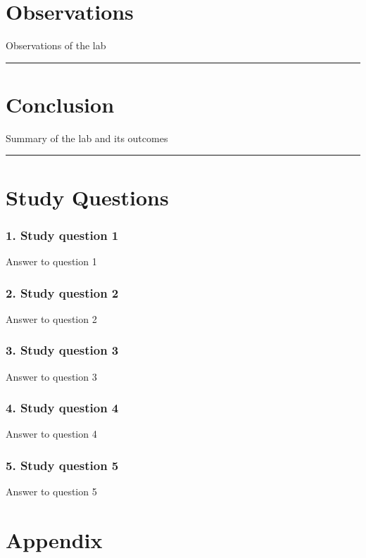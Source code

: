\documentclass{article}
\begin{document}
\section*{\textcolor{mycolor}{Observations}}
Observations of the lab
\vspace{5mm}
\hrule

\section*{\textcolor{mycolor}{Conclusion}}
Summary of the lab and its outcomes
\vspace{5mm}
\hrule

\section*{\textcolor{mycolor}{Study Questions}}
\subsubsection*{\textcolor{mycolor}{1. Study question 1}}
Answer to question 1
\subsubsection*{\textcolor{mycolor}{2. Study question 2}}
Answer to question 2
\subsubsection*{\textcolor{mycolor}{3. Study question 3}}
Answer to question 3
\subsubsection*{\textcolor{mycolor}{4. Study question 4}}
Answer to question 4
\subsubsection*{\textcolor{mycolor}{5. Study question 5}}
Answer to question 5
\section*{\textcolor{mycolor}{Appendix}}
\end{document}
